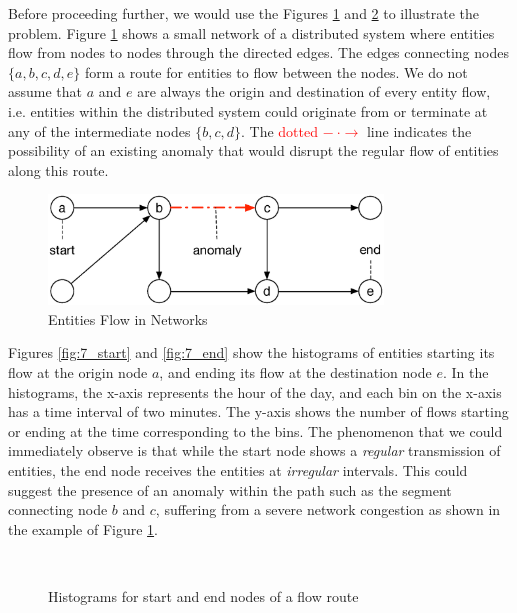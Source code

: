 \documentclass[conference]{IEEEtran.1.8}
\begin{document}
Before proceeding further, we would use the Figures \ref{fig:travel_graph} and \ref{fig:7} to illustrate the problem. Figure \ref{fig:travel_graph} shows a small network of a distributed system where entities flow from nodes to nodes through the directed edges. The edges connecting nodes $\{a, b, c, d, e\}$ form a route for entities to flow between the nodes. We do not assume that $a$ and $e$ are always the origin and destination of every entity flow, i.e. entities within the distributed system could originate from or terminate at any of the intermediate nodes $\{b, c, d\}$. The \textcolor{red}{dotted $- ~ \cdot \rightarrow$} line indicates the possibility of an existing anomaly that would disrupt the regular flow of entities along this route.
\begin{figure}[htb]
	\centering
	\includegraphics[width=3.5in]{travel_graph}
	\caption{Entities Flow in Networks}
	\label{fig:travel_graph}
\end{figure}

Figures \ref{fig:7_start} and \ref{fig:7_end} show the histograms of entities starting its flow at the origin node $a$, and ending its flow at the destination node $e$. In the histograms, the x-axis represents the hour of the day, and each bin on the x-axis has a time interval of two minutes. The y-axis shows the number of flows starting or ending at the time corresponding to the bins. The phenomenon that we could immediately observe is that while the start node shows a \emph{regular} transmission of entities, the end node receives the entities at \emph{irregular} intervals. This could suggest the presence of an anomaly within the path such as the segment connecting node $b$ and $c$, suffering from a severe network congestion as shown in the example of Figure \ref{fig:travel_graph}.
\begin{figure}[htb]
	\centering
	\\
	\caption{Histograms for start and end nodes of a flow route}
	\label{fig:7}
\end{figure}
\end{document}

